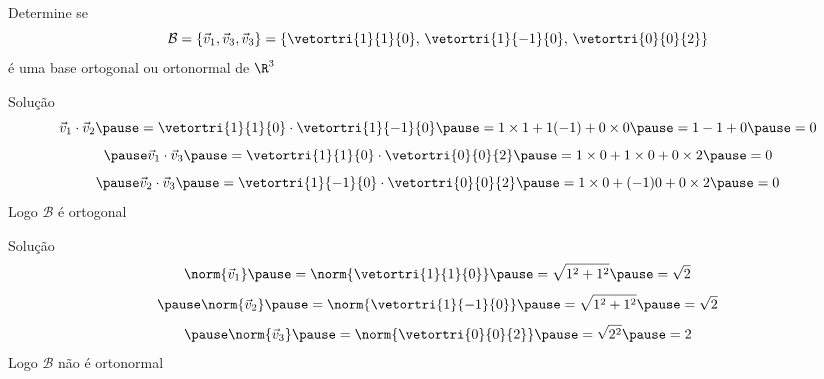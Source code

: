 \begin{question}
  Determine se
  \[
    \mathcal{B}
    = \left\{
      \vec{v}_1, \vec{v}_3, \vec{v}_3
    \right\}
    = \left\{
      \vetortri{1}{1}{0}, \,
      \vetortri{1}{-1}{0}, \,
      \vetortri{0}{0}{2}
    \right\}
  \]
  é uma base ortogonal ou ortonormal de $\R^3$
\end{question}

\begin{resolution}{Solução}
  \[
    \vec{v}_1\cdot\vec{v}_2
    \pause
    = \vetortri{1}{1}{0} \cdot \vetortri{1}{-1}{0}
    \pause
    = 1 \times 1 + 1(-1) + 0 \times 0
    \pause
    = 1 - 1 + 0
    \pause
    = 0
  \]
  \[
    \pause
    \vec{v}_1\cdot\vec{v}_3
    \pause
    = \vetortri{1}{1}{0} \cdot \vetortri{0}{0}{2}
    \pause
    = 1 \times 0 + 1 \times 0 + 0 \times 2
    \pause
    = 0
  \]
  \[
    \pause
    \vec{v}_2\cdot\vec{v}_3
    \pause
    = \vetortri{1}{-1}{0} \cdot \vetortri{0}{0}{2}
    \pause
    = 1 \times 0 + (-1)0 + 0 \times 2
    \pause
    = 0
  \]
  \pause
  Logo $\mathcal{B}$ é ortogonal
\end{resolution}

\begin{resolution}{Solução}
  \[
    \norm{\vec{v}_1}
    \pause
    = \norm{\vetortri{1}{1}{0}}
    \pause
    = \sqrt{1^2 + 1^2}
    \pause
    = \sqrt{2}
  \]
  \[
    \pause
    \norm{\vec{v}_2}
    \pause
    = \norm{\vetortri{1}{-1}{0}}
    \pause
    = \sqrt{1^2 + 1^2}
    \pause
    = \sqrt{2}
  \]
  \[
    \pause
    \norm{\vec{v}_3}
    \pause
    = \norm{\vetortri{0}{0}{2}}
    \pause
    = \sqrt{2^2}
    \pause
    = 2
  \]
  \pause
  Logo $\mathcal{B}$ não é ortonormal
\end{resolution}

\endinput
